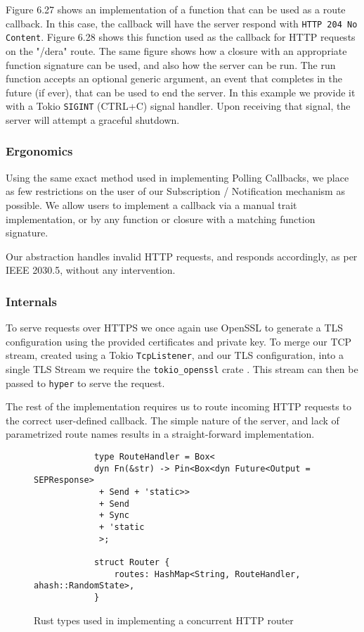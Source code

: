 Figure 6.27 shows an implementation of a function that can be used as a route callback. In this case, the callback will have the server respond with \texttt{HTTP 204 No Content}. Figure 6.28 shows this function used as the callback for HTTP requests on the "/dera" route. The same figure shows how a closure with an appropriate function signature can be used, and also how the server can be run. 
The run function accepts an optional generic argument, an event that completes in the future (if ever), that can be used to end the server. In this example we provide it with a Tokio \texttt{SIGINT} (CTRL+C) signal handler. Upon receiving that signal, the server will attempt a graceful shutdown.

\subsubsection{Ergonomics}
Using the same exact method used in implementing Polling Callbacks, we place as few restrictions on the user of our Subscription / Notification mechanism as possible. We allow users to implement a callback via a manual trait implementation, or by any function or closure with a matching function signature.

Our abstraction handles invalid HTTP requests, and responds accordingly, as per IEEE 2030.5, without any intervention.

\subsubsection{Internals}
To serve requests over HTTPS we once again use OpenSSL to generate a TLS configuration using the provided certificates and private key. To merge our TCP stream, created using a Tokio \texttt{TcpListener}, and our TLS configuration, into a single TLS Stream we require the \texttt{tokio\_openssl} crate \cite{tokioopenssl}. This stream can then be passed to \texttt{hyper} to serve the request.

The rest of the implementation requires us to route incoming HTTP requests to the correct user-defined callback. The simple nature of the server, and lack of parametrized route names results in a straight-forward implementation.

\begin{figure}[h]
    \begin{center}
        \begin{lstlisting}
            type RouteHandler = Box<
            dyn Fn(&str) -> Pin<Box<dyn Future<Output = SEPResponse>
             + Send + 'static>>
             + Send
             + Sync
             + 'static
             >;

            struct Router {
                routes: HashMap<String, RouteHandler, ahash::RandomState>,
            }

        \end{lstlisting}
        \label{fig:routerimpl}
        \vspace{-10pt}
        \caption{Rust types used in implementing a concurrent HTTP router}
    \end{center}
\end{figure}

